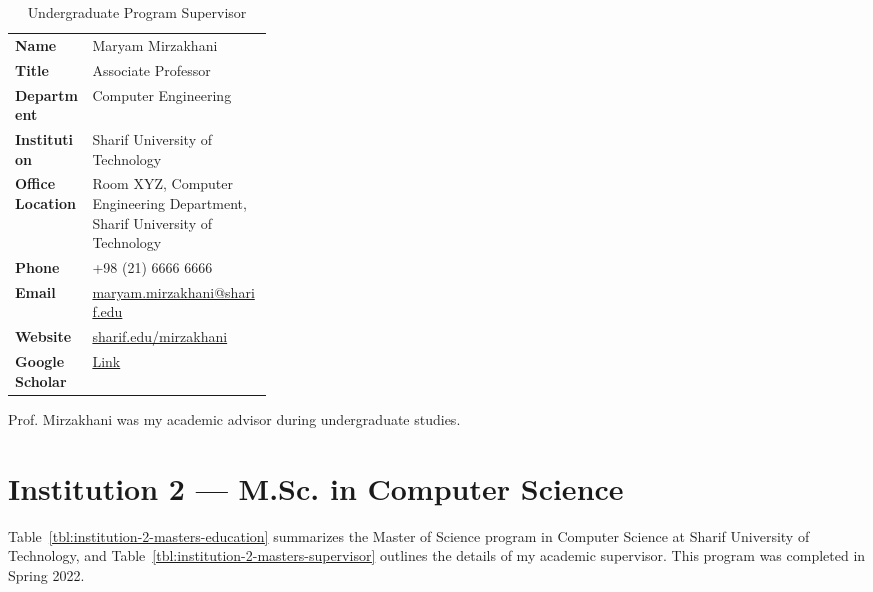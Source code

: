 \vspace{0.5cm}

\begin{table}[ht]
  \centering
  \begin{threeparttable}
    \renewcommand{\arraystretch}{1.3}
    \caption{Undergraduate Program Supervisor}
    \label{tbl:institution-1-bachelor-supervisor}
    \fontsize{9.5}{12}\selectfont
    \begin{tabularx}{0.65\textwidth}{
      >{\raggedright\arraybackslash}p{0.3\linewidth}
      >{\raggedright\arraybackslash}X
    }
    \toprule
    \cellcolor{myLightBlue}\textbf{Name} & Maryam Mirzakhani \\ 
    \cellcolor{myLightBlue}\textbf{Title} & Associate Professor \\ 
    \cellcolor{myLightBlue}\textbf{Department} & Computer Engineering \\ 
    \cellcolor{myLightBlue}\textbf{Institution} & Sharif University of Technology \\ 
    \cellcolor{myLightBlue}\textbf{Office Location} & Room XYZ, Computer Engineering Department, Sharif University of Technology \\ 
    \cellcolor{myLightBlue}\textbf{Phone} & +98 (21) 6666 6666 \\ 
    \cellcolor{myLightBlue}\textbf{Email} & \href{mailto:maryam.mirzakhani@sharif.edu}{maryam.mirzakhani@sharif.edu} \\ 
    \cellcolor{myLightBlue}\textbf{Website} & \href{https://sharif.edu/}{sharif.edu/\raisebox{0.5ex}{\texttildelow}mirzakhani} \\ 
    
    \cellcolor{myLightBlue}\textbf{Google Scholar} & \href{https://scholar.google.com/}{Link} \\
    \bottomrule
    \end{tabularx}
    \begin{tablenotes}
      \footnotesize
      \vspace{0.15cm}
      \item Prof. Mirzakhani was my academic advisor during undergraduate studies.
    \end{tablenotes}
  \end{threeparttable}
  \vspace{0.5cm}
\end{table}


\clearpage

\section{Institution 2 — M.Sc. in Computer Science}\label{sec:institution-2-masters}
\noindent
Table~\ref{tbl:institution-2-masters-education} summarizes the Master of Science program in Computer Science at Sharif University of Technology, and Table~\ref{tbl:institution-2-masters-supervisor} outlines the details of my academic supervisor. This program was completed in Spring 2022.

